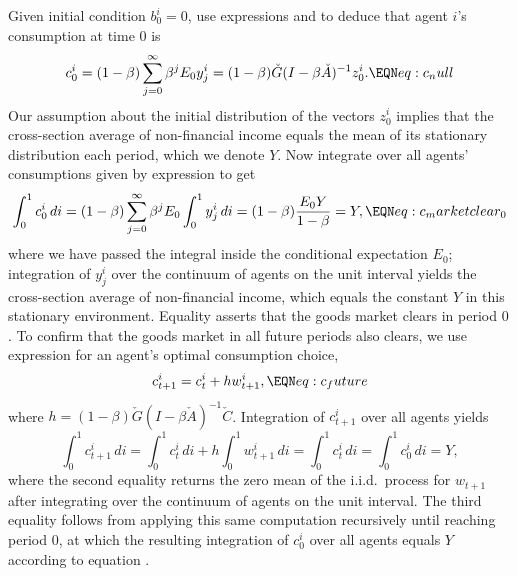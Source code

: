 Given initial condition $b^i_0 = 0$,  use  expressions
 and  to deduce that  agent $i$'s
consumption at time $0$ is 
$$ c^i_0 = (1-\beta) \sum_{j=0}^\infty \beta^j E_0 y^i_{j} 
         = (1-\beta) \check G(I-\beta \check A)^{-1} z^i_0.
                                         \EQN eq:c_null $$
Our assumption about the initial distribution of 
the vectors $z^i_0$ implies that the cross-section average of non-financial income equals the mean of its  stationary distribution each period, which we denote  $Y$. Now  integrate over all agents' consumptions  given
by expression  to get 
$$ \int_0^1 c^i_0 \, di 
= (1-\beta) \sum_{j=0}^\infty \beta^j 
             E_0 \int_0^1 y^i_{j} \, di
= (1-\beta) {\frac{E_0 Y}{1-\beta}} = Y ,
                                    \EQN eq:c_marketclear_0
$$
where we have passed the integral inside the
conditional expectation $E_0$; 
integration of $y^i_{j}$ over the continuum of agents on
the unit interval yields the cross-section average of 
non-financial income, which  equals the constant $Y$ in 
this stationary environment. Equality  asserts that the goods market clears in period $0$.
To confirm that the goods market in all future 
periods also clears, we use expression  
 for an agent's optimal 
consumption choice,
$$ c^i_{t+1} = c^i_t + h w^i_{t+1} ,  \EQN eq:c_future
$$
where $h = (1-\beta) \check G (I - \beta \check A)^{-1} 
\check C $. 
Integration of $c^i_{t+1}$ over all
agents yields
$$ \int_0^1 c^i_{t+1} \,di 
= \int_0^1 c^i_t \,di + h \int_0^1 w^i_{t+1} \,di
= \int_0^1 c^i_t \,di = \int_0^1 c^i_0 \,di =Y,
$$ 
where the second equality returns the zero mean 
of the i.i.d.~process for $w_{t+1}$ after 
integrating over the continuum of agents on the 
unit interval. The third equality follows from 
applying this same computation recursively 
until reaching period $0$, at which the resulting 
integration of $c^i_0$ over all agents equals $Y$ 
according to equation . 



